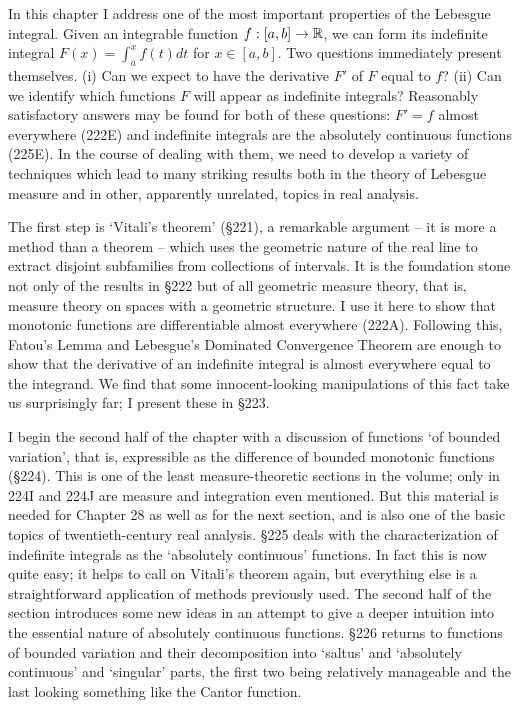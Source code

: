 
\def\chaptername{The Fundamental Theorem of Calculus}
\def\sectionname{Introduction}


In this chapter I address one of the most important properties of the
Lebesgue integral.   Given an integrable function $f:[a,b]\to\Bbb R$, we
can form its indefinite integral $F(x)=\int_a^xf(t)dt$ for $x\in[a,b]$.
Two questions immediately present themselves.   (i)  Can we expect to
have the derivative $F'$ of $F$ equal to $f$?   (ii)  Can we identify
which functions $F$ will appear as indefinite integrals?   Reasonably
satisfactory answers may be found for both of these questions:  $F'=f$
almost everywhere (222E) and indefinite integrals are the absolutely
continuous functions (225E).   In the course of dealing with them, we
need to develop a variety of techniques which lead to many striking
results both in the theory of Lebesgue measure and in other, apparently
unrelated, topics in real analysis.

The first step is `Vitali's theorem' (\S221), a remarkable
argument -- it is more a method than a theorem -- which uses the
geometric nature of the real line to extract disjoint subfamilies from
collections of intervals.   It is the foundation stone not only of the
results in \S222 but of all geometric measure theory, that is, measure
theory on spaces with a geometric structure.   I use it here to show
that monotonic functions are differentiable almost everywhere (222A).
Following this, Fatou's Lemma and Lebesgue's Dominated Convergence
Theorem are enough to show that the derivative of an indefinite integral
is almost everywhere equal to the integrand.   We find that some
innocent-looking manipulations of this fact take us surprisingly far;  I
present these in \S223.

I begin the second half of the chapter with a discussion of functions
`of bounded variation', that is, expressible as the difference of
bounded monotonic functions (\S224).   This is one of the least
measure-theoretic sections in the volume;  only in 224I and 224J are 
measure and integration even mentioned.   But this material is needed for 
Chapter 28 as well as for the next section, and is also
one of the basic topics of twentieth-century real analysis.   
\S225 deals with the
characterization of indefinite integrals as the `absolutely
continuous' functions.   In fact this is now quite easy;  it helps to
call on Vitali's theorem again, but everything else is a straightforward
application of methods previously used.   The second half of the section
introduces some new ideas in an attempt to give a deeper intuition into
the essential nature of absolutely continuous functions.   \S226 returns
to functions of bounded variation and their decomposition into
`saltus' and `absolutely continuous' and `singular' parts, the
first two being relatively manageable and the last looking something
like the Cantor function.



\discrpage

